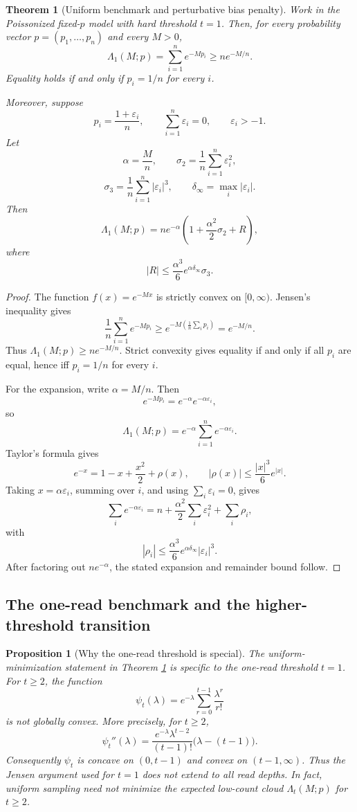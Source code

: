 \documentclass[11pt]{article}
\newtheorem{theorem}{Theorem}
\newtheorem{proposition}{Proposition}
\theoremstyle{definition}
\theoremstyle{remark}
\newcommand{\1}{\mathbf 1}
\begin{document}
\begin{theorem}[Uniform benchmark and perturbative bias penalty]\label{thm:uniform-penalty}
Work in the Poissonized fixed-\(p\) model with hard threshold \(t=1\).  Then, for every probability vector \(p=(p_1,\ldots,p_n)\) and every \(M>0\),
\[
  \Lambda_1(M;p)=\sum_{i=1}^n e^{-Mp_i}
  \ge n e^{-M/n}.
\]
Equality holds if and only if \(p_i=1/n\) for every \(i\).

Moreover, suppose
\[
  p_i=\frac{1+\varepsilon_i}{n},
  \qquad \sum_{i=1}^n\varepsilon_i=0,
  \qquad \varepsilon_i>-1.
\]
Let
\[
  \alpha=\frac{M}{n},\qquad
  \sigma_2=\frac1n\sum_{i=1}^n\varepsilon_i^2,
\]
\[
  \sigma_3=\frac1n\sum_{i=1}^n|\varepsilon_i|^3,
  \qquad
  \delta_\infty=\max_i|\varepsilon_i|.
\]
Then
\[
  \Lambda_1(M;p)
  =n e^{-\alpha}\left(1+\frac{\alpha^2}{2}\sigma_2+R\right),
\]
where
\[
  |R|\le \frac{\alpha^3}{6}e^{\alpha\delta_\infty}\sigma_3.
\]
\end{theorem}

\begin{proof}
The function \(f(x)=e^{-Mx}\) is strictly convex on \([0,\infty)\).  Jensen's inequality gives
\[
  \frac1n\sum_{i=1}^n e^{-Mp_i}
  \ge e^{-M(\frac1n\sum_i p_i)}=e^{-M/n}.
\]
Thus \(\Lambda_1(M;p)\ge n e^{-M/n}\).  Strict convexity gives equality if and only if all \(p_i\) are equal, hence iff \(p_i=1/n\) for every \(i\).

For the expansion, write \(\alpha=M/n\).  Then
\[
  e^{-Mp_i}=e^{-\alpha}e^{-\alpha\varepsilon_i},
\]
so
\[
  \Lambda_1(M;p)=e^{-\alpha}\sum_{i=1}^n e^{-\alpha\varepsilon_i}.
\]
Taylor's formula gives
\[
  e^{-x}=1-x+\frac{x^2}{2}+\rho(x),
  \qquad |\rho(x)|\le \frac{|x|^3}{6}e^{|x|}.
\]
Taking \(x=\alpha\varepsilon_i\), summing over \(i\), and using \(\sum_i\varepsilon_i=0\), gives
\[
  \sum_i e^{-\alpha\varepsilon_i}
  =n+\frac{\alpha^2}{2}\sum_i\varepsilon_i^2+\sum_i\rho_i,
\]
with
\[
  |\rho_i|\le \frac{\alpha^3}{6}e^{\alpha\delta_\infty}|\varepsilon_i|^3.
\]
After factoring out \(n e^{-\alpha}\), the stated expansion and remainder bound follow.
\end{proof}


\subsection{The one-read benchmark and the higher-threshold transition}

\begin{proposition}[Why the one-read threshold is special]\label{prop:tge2-not-uniform}
The uniform-minimization statement in Theorem \ref{thm:uniform-penalty} is specific to the one-read threshold \(t=1\).  For \(t\ge2\), the function
\[
  \psi_t(\lambda)=e^{-\lambda}\sum_{r=0}^{t-1}\frac{\lambda^r}{r!}
\]
is not globally convex.  More precisely, for \(t\ge2\),
\[
  \psi_t''(\lambda)=
  \frac{e^{-\lambda}\lambda^{t-2}}{(t-1)!}\bigl(\lambda-(t-1)\bigr).
\]
Consequently \(\psi_t\) is concave on \((0,t-1)\) and convex on \((t-1,\infty)\).  Thus the Jensen argument used for \(t=1\) does not extend to all read depths.  In fact, uniform sampling need not minimize the expected low-count cloud \(\Lambda_t(M;p)\) for \(t\ge2\).
\end{proposition}
\end{document}
